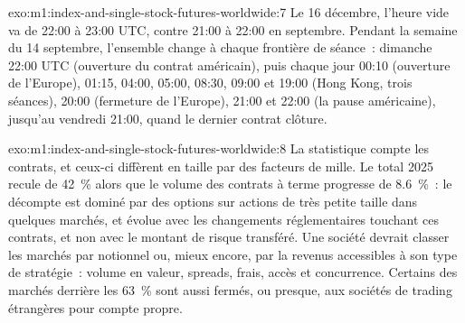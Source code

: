 \begin{solution}{exo:m1:index-and-single-stock-futures-worldwide:7}
Le 16 décembre, l'heure vide va de 22:00 à 23:00 UTC, contre 21:00 à 22:00
en septembre. Pendant la semaine du 14 septembre, l'ensemble change à chaque
frontière de séance~: dimanche 22:00 UTC (ouverture du contrat américain), puis chaque
jour 00:10 (ouverture de l'Europe), 01:15, 04:00, 05:00, 08:30, 09:00 et 19:00 (Hong
Kong, trois séances), 20:00 (fermeture de l'Europe), 21:00 et 22:00 (la
pause américaine), jusqu'au vendredi 21:00, quand le dernier contrat clôture.
\end{solution}

\begin{solution}{exo:m1:index-and-single-stock-futures-worldwide:8}
La statistique compte les contrats, et ceux-ci diffèrent en taille par des facteurs de
mille. Le total 2025 recule de 42~\% alors que le volume des contrats à terme progresse de 8.6~\%~: le décompte
est dominé par des options sur actions de très petite taille dans quelques marchés, et évolue
avec les changements réglementaires touchant ces contrats, et non avec le montant de risque
transféré. Une société devrait classer les marchés par notionnel ou, mieux encore, par la
revenus accessibles à son type de stratégie~: volume en valeur, spreads, frais,
accès et concurrence. Certains des marchés derrière les 63~\% sont aussi fermés,
ou presque, aux sociétés de trading étrangères pour compte propre.
\end{solution}

